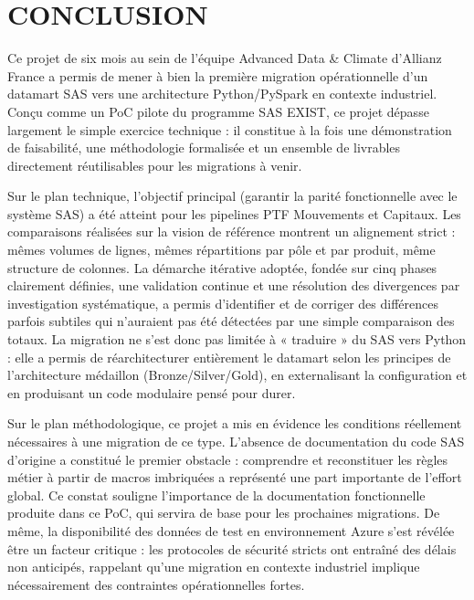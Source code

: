 \chapter*{CONCLUSION}

Ce projet de six mois au sein de l'équipe Advanced Data \& Climate d'Allianz France a permis de mener à bien la première migration opérationnelle d'un datamart SAS vers une architecture Python/PySpark en contexte industriel. Conçu comme un PoC pilote du programme SAS EXIST, ce projet dépasse largement le simple exercice technique : il constitue à la fois une démonstration de faisabilité, une méthodologie formalisée et un ensemble de livrables directement réutilisables pour les migrations à venir.

Sur le plan technique, l'objectif principal (garantir la parité fonctionnelle avec le système SAS) a été atteint pour les pipelines PTF Mouvements et Capitaux. Les comparaisons réalisées sur la vision de référence montrent un alignement strict : mêmes volumes de lignes, mêmes répartitions par pôle et par produit, même structure de colonnes. La démarche itérative adoptée, fondée sur cinq phases clairement définies, une validation continue et une résolution des divergences par investigation systématique, a permis d'identifier et de corriger des différences parfois subtiles qui n'auraient pas été détectées par une simple comparaison des totaux. La migration ne s'est donc pas limitée à « traduire » du SAS vers Python : elle a permis de réarchitecturer entièrement le datamart selon les principes de l'architecture médaillon (Bronze/Silver/Gold), en externalisant la configuration et en produisant un code modulaire pensé pour durer.

Sur le plan méthodologique, ce projet a mis en évidence les conditions réellement nécessaires à une migration de ce type. L'absence de documentation du code SAS d'origine a constitué le premier obstacle : comprendre et reconstituer les règles métier à partir de macros imbriquées a représenté une part importante de l'effort global. Ce constat souligne l'importance de la documentation fonctionnelle produite dans ce PoC, qui servira de base pour les prochaines migrations. De même, la disponibilité des données de test en environnement Azure s'est révélée être un facteur critique : les protocoles de sécurité stricts ont entraîné des délais non anticipés, rappelant qu'une migration en contexte industriel implique nécessairement des contraintes opérationnelles fortes.

